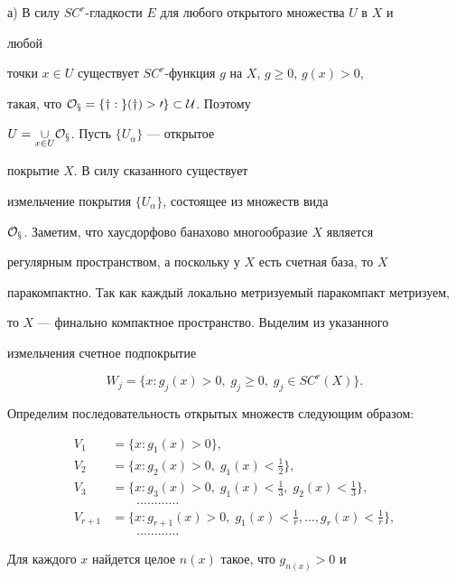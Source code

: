 \begin{pf}


а) В силу $SC^r$-гладкости $E$ для любого открытого множества $U$ в $X$ и


любой


точки $x\in U$ существует $SC^r$-функция $g$ на $X$, $g\ge 0$, $g(x)>0$,


такая, что $\cal O_x=\{y:g(y)>0\}\subset U$. Поэтому


$U=\underset{x\in U}{\cup}{}\cal O_x$. Пусть $\{U_\alpha\}$ --- открытое


покрытие $X$. В силу сказанного существует


измельчение покрытия $\{U_\alpha\}$, состоящее из множеств вида


$\cal O_x$. Заметим, что хаусдорфово банахово многообразие $X$ является


регулярным пространством, а поскольку у $X$ есть счетная база, то $X$


паракомпактно. Так как каждый локально метризуемый паракомпакт метризуем,


то $X$ --- финально компактное пространство. Выделим из указанного


измельчения счетное подпокрытие


$$


W_j=\{x:g_j(x)>0,\;g_j\ge 0,\;g_j\in SC^r(X)\}.


$$


Определим последовательность открытых множеств следующим образом:


\begin{align*}


V_1&=\{x:g_1(x)>0\},\\


V_2&=\{x:g_2(x)>0,\;g_1(x)<\tfrac{1}{2}\},\\


V_3&=\{x:g_3(x)>0,\;g_1(x)<\tfrac{1}{3},\;g_2(x)<\tfrac{1}{3}\},\\


&\qquad\dots\dots\dots\dots\\


V_{r+1}&=\{x:g_{r+1}(x)>0,\; g_1(x)<\tfrac{1}{r},\dotsc,


g_r(x)<\tfrac{1}{r}\},\\


&\qquad\dots\dots\dots\dots


\end{align*}


Для каждого $x$ найдется целое $n(x)$ такое, что $g_{n(x)}>0$ и



\end{pf}
